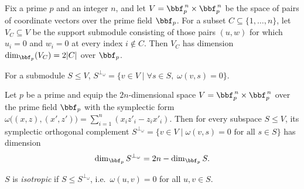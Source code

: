 \begin{lemma}
\label{dim_V_sub}
\leanok
{}
Fix a prime $p$ and an integer $n$, and let $V = \bbf_p^{\,n} \times \bbf_p^{\,n}$ be
the space of pairs of coordinate vectors over the prime field $\bbf_p$. For a subset $C
\subseteq \{1, \dots, n\}$, let $V_C \subseteq V$ be the support submodule consisting of
those pairs $(u, w)$ for which $u_i = 0$ and $w_i = 0$ at every index $i \notin C$. Then
$V_C$ has dimension $\dim_{\bbf_p}(V_C) = 2\lvert C\rvert$ over $\bbf_p$.
\end{lemma}

\begin{definition}
\label{sym_orth}
\leanok
{}
For a submodule $S \le V$,
$S^{\perp_\omega} = \{v \in V \mid \forall s \in S,\; \omega(v,s) = 0\}$.
\end{definition}

\begin{lemma}
\label{finrank_sym_orth}
\leanok
{}
Let $p$ be a prime and equip the $2n$-dimensional space $V = \bbf_p^{\,n} \times
\bbf_p^{\,n}$ over the prime field $\bbf_p$ with the symplectic form
$\omega\big((x,z),(x',z')\big) = \sum_{i=1}^{n}(x_i z'_i - z_i x'_i)$. Then for every
subspace $S \le V$, its symplectic orthogonal complement $S^{\perp_\omega} = \{v \in V
\mid \omega(v,s) = 0 \text{ for all } s \in S\}$ has dimension \[ \dim_{\bbf_p}
S^{\perp_\omega} = 2n - \dim_{\bbf_p} S. \]
\end{lemma}

\begin{definition}
\label{IsIsotropic}
\leanok
{}
$S$ is \emph{isotropic} if $S \le S^{\perp_\omega}$, i.e.\ $\omega(u,v) = 0$
for all $u,v \in S$.
\end{definition}

